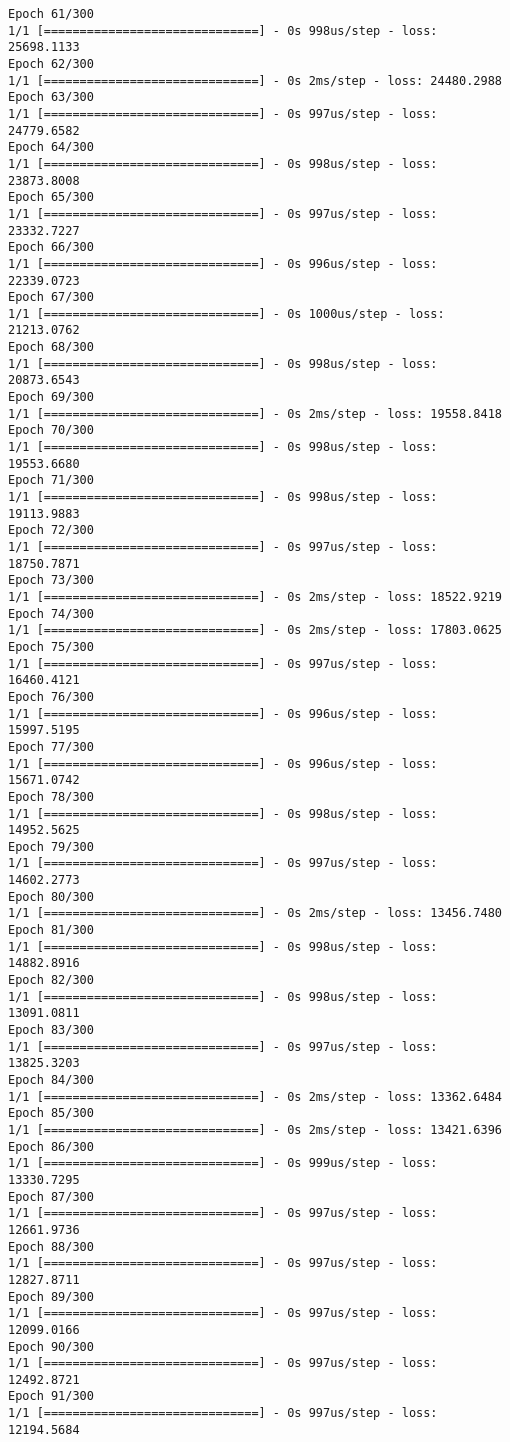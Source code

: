 \documentclass[11pt]{article}
\begin{document}
\begin{Verbatim}[commandchars=\\\{\}]
Epoch 61/300
1/1 [==============================] - 0s 998us/step - loss: 25698.1133
Epoch 62/300
1/1 [==============================] - 0s 2ms/step - loss: 24480.2988
Epoch 63/300
1/1 [==============================] - 0s 997us/step - loss: 24779.6582
Epoch 64/300
1/1 [==============================] - 0s 998us/step - loss: 23873.8008
Epoch 65/300
1/1 [==============================] - 0s 997us/step - loss: 23332.7227
Epoch 66/300
1/1 [==============================] - 0s 996us/step - loss: 22339.0723
Epoch 67/300
1/1 [==============================] - 0s 1000us/step - loss: 21213.0762
Epoch 68/300
1/1 [==============================] - 0s 998us/step - loss: 20873.6543
Epoch 69/300
1/1 [==============================] - 0s 2ms/step - loss: 19558.8418
Epoch 70/300
1/1 [==============================] - 0s 998us/step - loss: 19553.6680
Epoch 71/300
1/1 [==============================] - 0s 998us/step - loss: 19113.9883
Epoch 72/300
1/1 [==============================] - 0s 997us/step - loss: 18750.7871
Epoch 73/300
1/1 [==============================] - 0s 2ms/step - loss: 18522.9219
Epoch 74/300
1/1 [==============================] - 0s 2ms/step - loss: 17803.0625
Epoch 75/300
1/1 [==============================] - 0s 997us/step - loss: 16460.4121
Epoch 76/300
1/1 [==============================] - 0s 996us/step - loss: 15997.5195
Epoch 77/300
1/1 [==============================] - 0s 996us/step - loss: 15671.0742
Epoch 78/300
1/1 [==============================] - 0s 998us/step - loss: 14952.5625
Epoch 79/300
1/1 [==============================] - 0s 997us/step - loss: 14602.2773
Epoch 80/300
1/1 [==============================] - 0s 2ms/step - loss: 13456.7480
Epoch 81/300
1/1 [==============================] - 0s 998us/step - loss: 14882.8916
Epoch 82/300
1/1 [==============================] - 0s 998us/step - loss: 13091.0811
Epoch 83/300
1/1 [==============================] - 0s 997us/step - loss: 13825.3203
Epoch 84/300
1/1 [==============================] - 0s 2ms/step - loss: 13362.6484
Epoch 85/300
1/1 [==============================] - 0s 2ms/step - loss: 13421.6396
Epoch 86/300
1/1 [==============================] - 0s 999us/step - loss: 13330.7295
Epoch 87/300
1/1 [==============================] - 0s 997us/step - loss: 12661.9736
Epoch 88/300
1/1 [==============================] - 0s 997us/step - loss: 12827.8711
Epoch 89/300
1/1 [==============================] - 0s 997us/step - loss: 12099.0166
Epoch 90/300
1/1 [==============================] - 0s 997us/step - loss: 12492.8721
Epoch 91/300
1/1 [==============================] - 0s 997us/step - loss: 12194.5684

\end{Verbatim}
\end{document}
